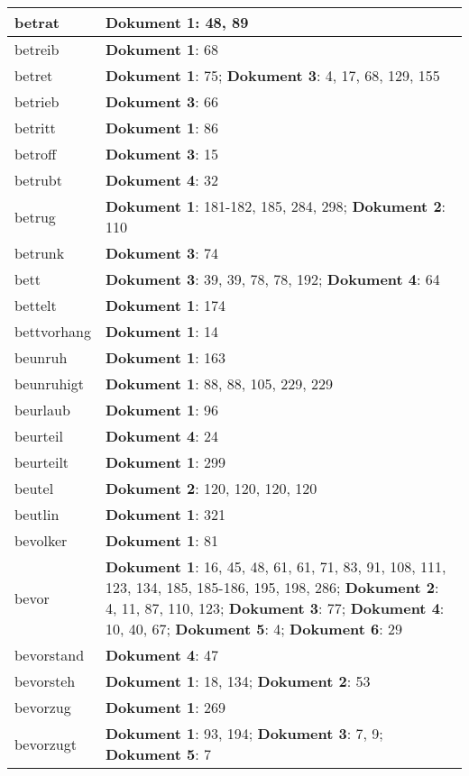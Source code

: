 \documentclass[a5paper]{article}
\begin{document}
\begin{longtable}[l]{|l|p{3in}|}
\hline
betrat & \textbf{Dokument 1}: 48, 89 \\
\hline
betreib & \textbf{Dokument 1}: 68 \\
\hline
betret & \textbf{Dokument 1}: 75; \textbf{Dokument 3}: 4, 17, 68, 129, 155 \\
\hline
betrieb & \textbf{Dokument 3}: 66 \\
\hline
betritt & \textbf{Dokument 1}: 86 \\
\hline
betroff & \textbf{Dokument 3}: 15 \\
\hline
betrubt & \textbf{Dokument 4}: 32 \\
\hline
betrug & \textbf{Dokument 1}: 181-182, 185, 284, 298; \textbf{Dokument 2}: 110 \\
\hline
betrunk & \textbf{Dokument 3}: 74 \\
\hline
bett & \textbf{Dokument 3}: 39, 39, 78, 78, 192; \textbf{Dokument 4}: 64 \\
\hline
bettelt & \textbf{Dokument 1}: 174 \\
\hline
bettvorhang & \textbf{Dokument 1}: 14 \\
\hline
beunruh & \textbf{Dokument 1}: 163 \\
\hline
beunruhigt & \textbf{Dokument 1}: 88, 88, 105, 229, 229 \\
\hline
beurlaub & \textbf{Dokument 1}: 96 \\
\hline
beurteil & \textbf{Dokument 4}: 24 \\
\hline
beurteilt & \textbf{Dokument 1}: 299 \\
\hline
beutel & \textbf{Dokument 2}: 120, 120, 120, 120 \\
\hline
beutlin & \textbf{Dokument 1}: 321 \\
\hline
bevolker & \textbf{Dokument 1}: 81 \\
\hline
bevor & \textbf{Dokument 1}: 16, 45, 48, 61, 61, 71, 83, 91, 108, 111, 123, 134, 185, 185-186, 195, 198, 286; \textbf{Dokument 2}: 4, 11, 87, 110, 123; \textbf{Dokument 3}: 77; \textbf{Dokument 4}: 10, 40, 67; \textbf{Dokument 5}: 4; \textbf{Dokument 6}: 29 \\
\hline
bevorstand & \textbf{Dokument 4}: 47 \\
\hline
bevorsteh & \textbf{Dokument 1}: 18, 134; \textbf{Dokument 2}: 53 \\
\hline
bevorzug & \textbf{Dokument 1}: 269 \\
\hline
bevorzugt & \textbf{Dokument 1}: 93, 194; \textbf{Dokument 3}: 7, 9; \textbf{Dokument 5}: 7 \\
\hline

\end{longtable}
\end{document}
